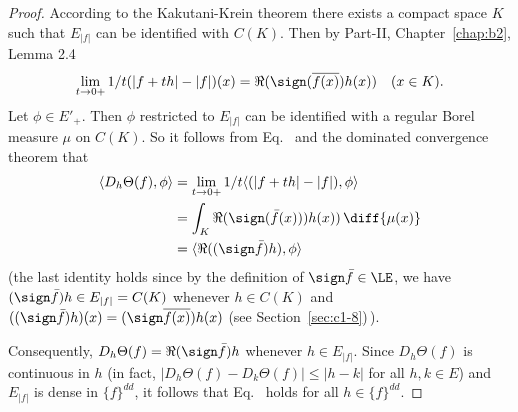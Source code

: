 \begin{proof}
According to the Kakutani-Krein theorem there exists a compact space
$K$ such that $E_{|f|}$ can be identified with $C(K)$. Then by Part-II, Chapter~\ref{chap:b2}, 
Lemma 2.4
\begin{equation}\label{eq:c2-5.9}
\lim_{t \to 0+} 1/t(|f+th| - |f|)(x) = \Re(\sign (\overline{f(x)})h(x)) \quad (x \in K).
\end{equation}
Let $\phi \in E'_{+}$. Then $\phi$ restricted to $E_{|f|}$ can be identified with a regular Borel measure $\mu$ on $C(K)$.
So it follows from Eq.~ and the dominated convergence theorem that
\begin{align*}
\langle D_{h}\Theta(f),\phi \rangle &= \lim_{t \to 0+} 1/t \langle(|f + th| - |f|),\phi \rangle\\
&= \int_{K} \Re(\sign (\bar{f}(x)))h(x)) \, \diff{\mu(x)} \\
&= \langle\Re((\sign  \bar{f})h),\phi\rangle
\end{align*}
(the last identity holds since by the definition of\/ $\sign  \bar{f} \in \LE$,
we have $(\sign  \bar{f})h \in E_{|f|} = C(K)$ whenever $h \in C(K)$ and
$((\sign  \bar{f})h)(x) = (\sign  \overline{f(x)})h(x)$  
(see Section~\ref{sec:c1-8})\,).

Consequently, $D_{h}\Theta(f) = \Re(\sign  \bar{f})h$ whenever $h \in E_{|f|}$. 
Since $D_{h}\Theta(f)$ is continuous in $h$ (in fact, $|D_{h}\Theta(f) - D_{k}\Theta(f)| \leq |h - k|$ for all $h,k \in E$) and $E_{|f|}$ is dense in $\{f\}^{dd}$, it follows that Eq.~ holds for all $h \in \{f\}^{dd}$.
\end{proof}

